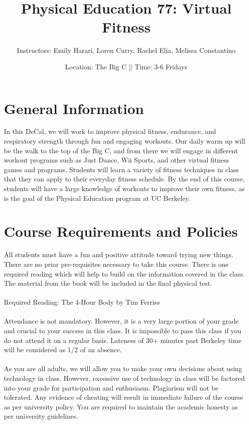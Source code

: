 \documentclass[letterpaper,12pt]{article}
\begin{document}
\title{Physical Education 77: Virtual Fitness}
\date{Location: The Big C || Time: 3-6 Fridays }
\author{Instructors: Emily Harari, Loren Curry, Rachel Elia, Melissa Constantino}
\maketitle

\section{General Information}
In this DeCal, we will work to improve physical fitness, endurance, and respiratory strength through fun and engaging workouts. Our daily warm up will be the walk to the top of the Big C, and from there we will engage in different workout programs such as Just Dance, Wii Sports, and other virtual fitness games and programs. Students will learn a variety of fitness techniques in class that they can apply to their everyday fitness schedule. By the end of this course, students will have a large knowledge of workouts to improve their own fitness, as is the goal of the Physical Education program at UC Berkeley.  

\section{Course Requirements and Policies}

All students must have a fun and positive attitude toward trying new things. There are no prior pre-requisites necessary to take this course. There is one required reading which will help to build on the information covered in the class. The material from the book will be included in the final physical test.\\
\\
Required Reading: The 4-Hour Body by Tim Ferriss \\
\\
Attendance is not mandatory. However, it is a very large portion of your grade and crucial to your success in this class. It is impossible to pass this class if you do not attend it on a regular basis. Lateness of 30+ minutes past Berkeley time will be considered as 1/2 of an absence.\\
\\
As you are all adults, we will allow you to make your own decisions about using technology in class. However, excessive use of technology in class will be factored into your grade for participation and enthusiasm. Plagiarism will not be tolerated. Any evidence of cheating will result in immediate failure
of the course as per university policy. You are required to maintain the academic honesty as per university guidelines. 
\end{document}
